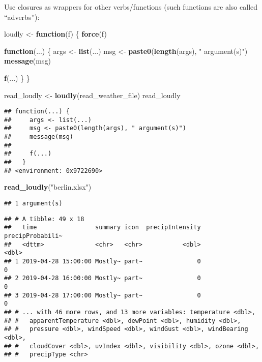 \documentclass[]{book}
\newenvironment{Shaded}{\begin{snugshade}}{\end{snugshade}}
\newcommand{\ControlFlowTok}[1]{\textcolor[rgb]{0.13,0.29,0.53}{\textbf{#1}}}
\newcommand{\KeywordTok}[1]{\textcolor[rgb]{0.13,0.29,0.53}{\textbf{#1}}}
\newcommand{\NormalTok}[1]{#1}
\newcommand{\StringTok}[1]{\textcolor[rgb]{0.31,0.60,0.02}{#1}}
\begin{document}
Use closures as wrappers for other verbs/functions (such functions are also called ``adverbs''):

\begin{Shaded}
\begin{Highlighting}[]
\NormalTok{loudly <-}\StringTok{ }\ControlFlowTok{function}\NormalTok{(f) \{}
  \KeywordTok{force}\NormalTok{(f)}

  \ControlFlowTok{function}\NormalTok{(...) \{}
\NormalTok{    args <-}\StringTok{ }\KeywordTok{list}\NormalTok{(...)}
\NormalTok{    msg <-}\StringTok{ }\KeywordTok{paste0}\NormalTok{(}\KeywordTok{length}\NormalTok{(args), }\StringTok{" argument(s)"}\NormalTok{)}
    \KeywordTok{message}\NormalTok{(msg)}

    \KeywordTok{f}\NormalTok{(...)}
\NormalTok{  \}}
\NormalTok{\}}

\NormalTok{read_loudly <-}\StringTok{ }\KeywordTok{loudly}\NormalTok{(read_weather_file)}
\NormalTok{read_loudly}
\end{Highlighting}
\end{Shaded}

\begin{verbatim}
## function(...) {
##     args <- list(...)
##     msg <- paste0(length(args), " argument(s)")
##     message(msg)
## 
##     f(...)
##   }
## <environment: 0x9722690>
\end{verbatim}

\begin{Shaded}
\begin{Highlighting}[]
\KeywordTok{read_loudly}\NormalTok{(}\StringTok{"berlin.xlsx"}\NormalTok{)}
\end{Highlighting}
\end{Shaded}

\begin{verbatim}
## 1 argument(s)
\end{verbatim}

\begin{verbatim}
## # A tibble: 49 x 18
##   time                summary icon  precipIntensity precipProbabili~
##   <dttm>              <chr>   <chr>           <dbl>            <dbl>
## 1 2019-04-28 15:00:00 Mostly~ part~               0                0
## 2 2019-04-28 16:00:00 Mostly~ part~               0                0
## 3 2019-04-28 17:00:00 Mostly~ part~               0                0
## # ... with 46 more rows, and 13 more variables: temperature <dbl>,
## #   apparentTemperature <dbl>, dewPoint <dbl>, humidity <dbl>,
## #   pressure <dbl>, windSpeed <dbl>, windGust <dbl>, windBearing <dbl>,
## #   cloudCover <dbl>, uvIndex <dbl>, visibility <dbl>, ozone <dbl>,
## #   precipType <chr>
\end{verbatim}
\end{document}
